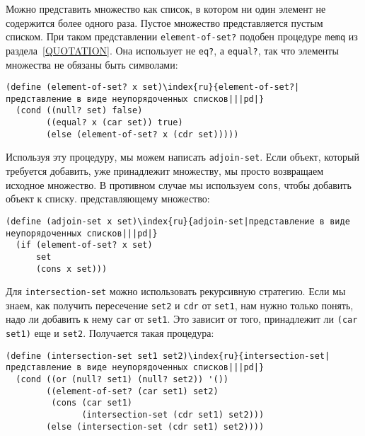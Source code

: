 Можно представить множество как список, в котором ни один 
элемент не содержится более одного раза.  Пустое множество
представляется пустым списком.  При таком представлении
{\tt element-of-set?} подобен процедуре {\tt memq} из
раздела~\ref{QUOTATION}.  Она использует не
{\tt eq?}, а {\tt equal?}, так что элементы множества не 
обязаны быть символами:

\begin{Verbatim}[fontsize=\small]
(define (element-of-set? x set)\index{ru}{element-of-set?|представление в виде неупорядоченных списков|||pd|}
  (cond ((null? set) false)
        ((equal? x (car set)) true)
        (else (element-of-set? x (cdr set)))))
\end{Verbatim}
Используя эту процедуру, мы можем написать
{\tt adjoin-set}. Если объект, который требуется добавить, уже
принадлежит множеству, мы просто возвращаем исходное множество.  В
противном случае мы используем {\tt cons}, чтобы добавить
объект к списку. представляющему множество:

\begin{Verbatim}[fontsize=\small]
(define (adjoin-set x set)\index{ru}{adjoin-set|представление в виде неупорядоченных списков|||pd|}
  (if (element-of-set? x set)
      set
      (cons x set)))
\end{Verbatim}
Для {\tt intersection-set} можно использовать рекурсивную
стратегию.  Если мы знаем, как получить пересечение {\tt set2} и 
{\tt cdr} от {\tt set1}, нам нужно только понять, надо
ли добавить к нему {\tt car} от {\tt set1}.  Это зависит 
от того, принадлежит ли {\tt (car set1)} еще и
{\tt set2}.  Получается такая процедура:

\begin{Verbatim}[fontsize=\small]
(define (intersection-set set1 set2)\index{ru}{intersection-set|представление в виде неупорядоченных списков|||pd|}
  (cond ((or (null? set1) (null? set2)) '())
        ((element-of-set? (car set1) set2)
         (cons (car set1)
               (intersection-set (cdr set1) set2)))
        (else (intersection-set (cdr set1) set2))))
\end{Verbatim}

